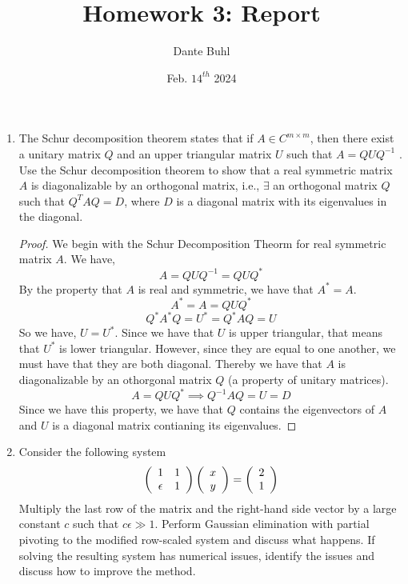 \documentclass{article}
\title{Homework 3: Report}
\author{Dante Buhl}
\date{Feb. $14^{th}$ 2024}
\begin{document}
\newcommand{\bs}[1]{\boldsymbol{#1}}
\newcommand{\bmp}[1]{\begin{minipage}{#1\textwidth}}
\newcommand{\emp}{\end{minipage}}
\newcommand{\R}{\mathbb{R}}
\newcommand{\C}{\mathbb{C}}
\newcommand{\N}{\mathcal{N}}
\newcommand{\I}{\mathrm{I}}
\newcommand{\K}{\bs{\mathrm{K}}}
\newcommand{\m}{\bs{\mu}_*}
\newcommand{\s}{\bs{\Sigma}_*}
\newcommand{\dt}{\Delta t}
\newcommand{\tr}[1]{\text{Tr}(#1)}
\newcommand{\Tr}[1]{\text{Tr}(#1)}

\maketitle


\begin{enumerate}

\item %
The Schur decomposition theorem states that if $A \in C^{m\times m}$, then there
exist a unitary matrix $Q$ and an upper triangular matrix $U$ such that
$A = QUQ^{-1}$ . Use the Schur decomposition theorem to show that a real
symmetric matrix $A$ is diagonalizable by an orthogonal matrix, i.e., $\exists$ an
orthogonal matrix $Q$ such that $Q^T AQ = D$, where $D$ is a diagonal matrix
with its eigenvalues in the diagonal.

\begin{proof}

We begin with the Schur Decomposition Theorm for real symmetric matrix $A$. We have, 
\[
    A = QUQ^{-1} = QUQ^*
\]
By the property that $A$ is real and symmetric, we have that $A^* = A$.
\[
    A^* = A = QUQ^*
\]
\[
    Q^*A^*Q = U^* = Q^*AQ = U
\]
So we have, $U = U^*$. Since we have that $U$ is upper triangular, that means that $U^*$ is lower triangular. However, since they are equal to one another, we must have that they are both diagonal. Thereby we have that $A$ is diagonalizable by an othorgonal matrix $Q$ (a property of unitary matrices).
\[
    A = QUQ^* \implies Q^{-1}AQ = U = D
\]
Since we have this property, we have that $Q$ contains the eigenvectors of $A$ and $U$ is a diagonal matrix contianing its eigenvalues. 

\end{proof}

\item
Consider the following system
\[
\left(\begin{array}{c c}
1 & 1 \\
\epsilon & 1 
\end{array}\right) \left(\begin{array}{c}
x \\
y
\end{array}\right) = \left(\begin{array}{c}
2 \\ 
1
\end{array}\right) 
\]
Multiply the last row of the matrix and the right-hand side vector by a large
constant $c$ such that $c\epsilon \gg 1$. Perform Gaussian elimination with partial
pivoting to the modified row-scaled system and discuss what happens. If
solving the resulting system has numerical issues, identify the issues and
discuss how to improve the method.


\end{enumerate}
\end{document}
